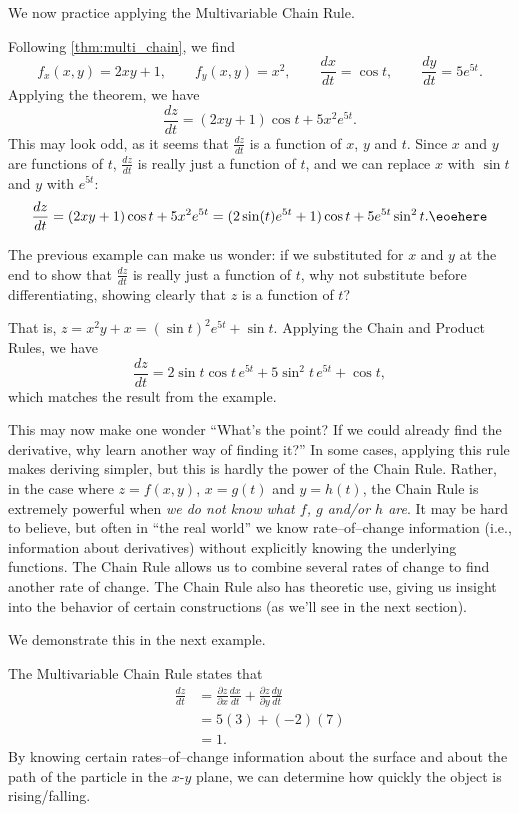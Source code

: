 We now practice applying the Multivariable Chain Rule.

{Following \autoref{thm:multi_chain}, we find
$$f_x(x,y) = 2xy+1,\qquad f_y(x,y) = x^2,\qquad \frac{dx}{dt} = \cos t,\qquad \frac{dy}{dt}= 5e^{5t}.$$
Applying the theorem, we have
$$\frac{dz}{dt} = (2xy+1)\cos t+ 5x^2e^{5t}.$$
This may look odd, as it seems that $\frac{dz}{dt}$ is a function of $x$, $y$ and $t$. Since $x$ and $y$ are functions of $t$, $\frac{dz}{dt}$ is really just a function of $t$, and we can replace $x$ with $\sin t$ and $y$ with $e^{5t}$:
$$\frac{dz}{dt} = (2xy+1)\cos t+ 5x^2e^{5t} = (2\sin (t)e^{5t}+1)\cos t+5e^{5t}\sin^2t.\eoehere$$}

The previous example can make us wonder: if we substituted for $x$ and $y$ at the end to show that $\frac{dz}{dt}$ is really just a function of $t$, why not substitute before differentiating, showing clearly that $z$ is a function of $t$?

That is, $z = x^2y+x = (\sin t)^2e^{5t}+\sin t.$ Applying the Chain and Product Rules, we have 
$$\frac{dz}{dt} = 2\sin t\cos t\, e^{5t}+ 5\sin^2t\,e^{5t}+\cos t,$$ which matches the result from the example.

This may now make one wonder ``What's the point? If we could already find the derivative, why learn another way of finding it?'' In some cases, applying this rule makes deriving simpler, but this is hardly the power of the Chain Rule. Rather, in the case where $z=f(x,y)$, $x=g(t)$ and $y=h(t)$, the Chain Rule is extremely powerful when \textit{we do not know what $f$, $g$ and/or $h$ are}. It may be hard to believe, but often in ``the real world'' we know rate--of--change information (i.e., information about derivatives) without explicitly knowing the underlying functions. The Chain Rule allows us to combine several rates of change to find another rate of change. The Chain Rule also has theoretic use, giving us insight into the behavior of certain constructions (as we'll see in the next section).

We demonstrate this in the next example.

{The Multivariable Chain Rule states that 
\begin{align*}
\frac{dz}{dt} &= \frac{\partial z}{\partial x}\frac{dx}{dt} + \frac{\partial z}{\partial y}\frac{dy}{dt} \\
				&= 5(3)+(-2)(7) \\
				&=1.
\end{align*}
By knowing certain rates--of--change information about the surface and about the path of the particle in the $x$-$y$ plane, we can determine how quickly the object is rising/falling.}

